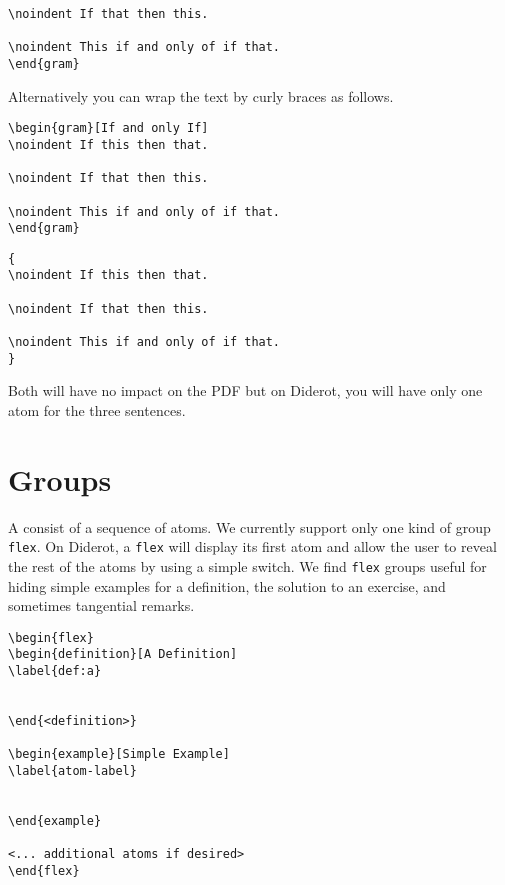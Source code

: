 \begin{example}
\begin{noten}
\begin{important}
\begin{lstlisting}
\noindent If that then this.

\noindent This if and only of if that.
\end{gram}
\end{lstlisting}

Alternatively you can wrap the text by curly braces as follows.
%
\begin{lstlisting}
\begin{gram}[If and only If]
\noindent If this then that.

\noindent If that then this.

\noindent This if and only of if that.
\end{gram}
\end{lstlisting}
%
\begin{lstlisting}
{
\noindent If this then that.

\noindent If that then this.

\noindent This if and only of if that.
}
\end{lstlisting}
%
Both will have no impact on the PDF but on Diderot, you will have only one atom for the three sentences.


\section{Groups}

\begin{definition}[Group]
A  consist of a sequence of atoms.  We currently support only one kind of group \lstinline`flex`.  On Diderot, a \lstinline`flex` will display its first atom and allow the user to reveal the rest of the atoms by using a simple switch.  We find \lstinline`flex` groups useful for hiding simple examples for a definition, the solution to an exercise, and sometimes tangential remarks.

\begin{lstlisting}
\begin{flex}
\begin{definition}[A Definition]
\label{def:a}


\end{<definition>}

\begin{example}[Simple Example]
\label{atom-label}


\end{example}

<... additional atoms if desired>
\end{flex}
\end{lstlisting}  


\end{definition}
\end{important}
\end{noten}
\end{example}
